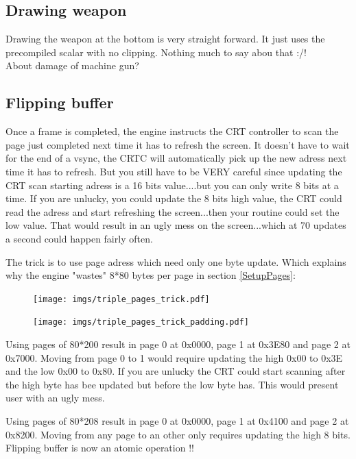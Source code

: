 \subsection{Drawing weapon}
Drawing the weapon at the bottom is very straight forward. It just uses the precompiled scalar with no clipping. Nothing much to say abou that :/!\\
 About damage of machine gun?





\subsection{Flipping buffer} \label{Flippingbuffer}
Once a frame is completed, the engine instructs the CRT controller to scan the page just completed next time it has to refresh the screen. It doesn't have to wait for the end of a vsync, the CRTC will automatically pick up the new adress next time it has to refresh. But you still have to be VERY careful since updating the CRT scan starting adress is a 16 bits value....but you can only write 8 bits at a time. If you are unlucky, you could update the 8 bits high value, the CRT could read the adress and start refreshing the screen...then your routine could set the low value. That would result in an ugly mess on the screen...which at 70 updates a second could happen fairly often.\\
\par
The trick is to use page adress which need only one byte update. Which explains why the engine "wastes" 8*80 bytes per page in section \ref{SetupPages}:\\
\par
\begin{figure}[H]
 \centering
 \texttt{[image: imgs/triple\_pages\_trick.pdf]}
\end{figure}
\par

\par
\begin{figure}[H]
 \centering
 \texttt{[image: imgs/triple\_pages\_trick\_padding.pdf]}
\end{figure}
\par


Using pages of 80*200 result in page 0 at 0x0000, page 1 at 0x3E80 and page 2 at 0x7000. Moving from page 0 to 1 would require updating the high 0x00 to 0x3E and the low 0x00 to 0x80. If you are unlucky the CRT could start scanning after the high byte has bee updated but before the low byte has. This would present user with an ugly mess.\\
\par
Using pages of 80*208 result in page 0 at 0x0000, page 1 at 0x4100 and page 2 at 0x8200. Moving from any page to an other only requires updating the high 8 bits. Flipping buffer is now an atomic operation !!\\





